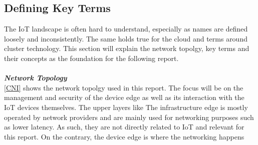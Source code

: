 \subsection{Defining Key Terms}
The IoT landscape is often hard to understand, especially as names are defined loosely and  inconsistently. The same holds true for the cloud and terms around cluster technology. This section will explain the network topolgy, key terms and their concepts as the foundation for the following report.\\

\vspace{0.5mm}\\
\textbf\textit{Network Topology}\\
\cref{CNI} shows the network topolgy used in this report. The focus will be on the management and security of the device edge as well as its interaction with the IoT devices themselves. The upper layers like 
The infrastructure edge is mostly operated by network providers and are mainly used for networking purposes such as lower latency. As such, they are not directly related to IoT and relevant for this report.
On the contrary, the device edge is where the networking happens

